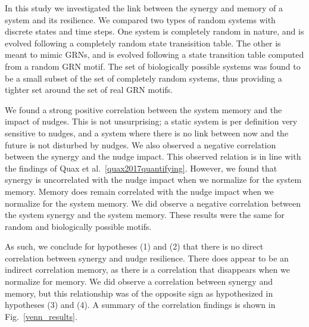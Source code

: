 \documentclass[../main.tex]{subfiles}
\begin{document}

In this study we investigated the link between the synergy and memory of a system and its resilience.
We compared two types of random systems with discrete states and time steps.
One system is completely random in nature, and is evolved following a completely random state transisition table.
The other is meant to mimic GRNs, and is evolved following a state transition table computed from a random GRN motif.
The set of biologically possible systems was found to be a small subset of the set of completely random systems, thus providing a tighter set around the set of real GRN motifs.

We found a strong positive correlation between the system memory and the impact of nudges.
This is not unsurprising; a static system is per definition very sensitive to nudges, and a system where there is no link between now and the future is not disturbed by nudges.
We also observed a negative correlation between the synergy and the nudge impact.
This observed relation is in line with the findings of Quax et al.~\ref{quax2017quantifying}.
However, we found that synergy is uncorrelated with the nudge impact when we normalize for the system memory.
Memory does remain correlated with the nudge impact when we normalize for the system memory.
We did observe a negative correlation between the system synergy and the system memory.
These results were the same for random and biologically possible motifs.

As such, we conclude for hypotheses (1) and (2) that there is no direct correlation between synergy and nudge resilience.
There does appear to be an indirect correlation memory, as there is a correlation that disappears when we normalize for memory.
We did observe a correlation between synergy and memory, but this relationship was of the opposite sign as hypothesized in hypotheses (3) and (4).
A summary of the correlation findings is shown in Fig.~\ref{venn_results}.
\end{document}
